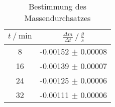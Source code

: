 \begin{table}
        \centering
        \label{tab:massendurchsatz}
        \begin{tabular}{c c}
        \toprule
        $t \mathbin{/} \si{\minute} $ & $\frac{\Delta m}{\Delta t} \mathbin{/} \si{\frac{g}{s}}$  \\
        \midrule
        8  & -0.00152 $\pm$ 0.00008 \\
        16 & -0.00139 $\pm$ 0.00007 \\
        24 & -0.00125 $\pm$ 0.00006 \\
        32 & -0.00111 $\pm$ 0.00006 \\
        \bottomrule
        \end{tabular}
        \caption{Bestimmung des Massendurchsatzes}
        \end{table}
